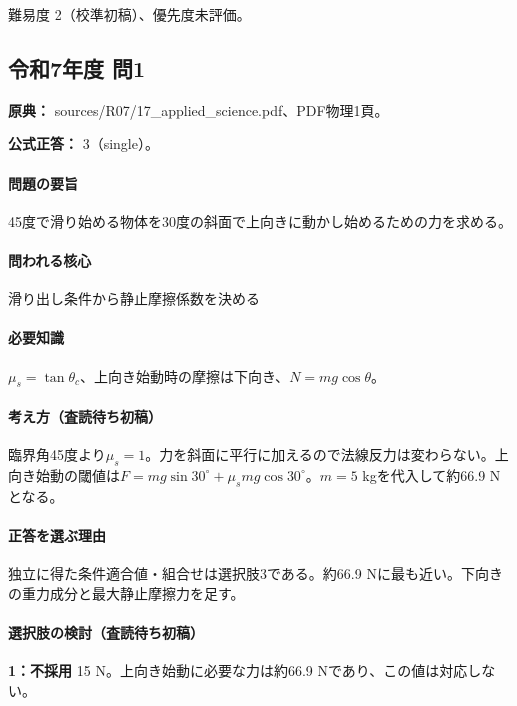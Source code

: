\par 難易度 2（校準初稿）、優先度未評価。

\subsection{令和7年度 問1}
\label{q:r07-reg-applied-01}

\noindent\textbf{原典：} sources/R07/17\_applied\_science.pdf、PDF物理1頁。

\textbf{公式正答：} 3（single）。

\paragraph{問題の要旨} 45度で滑り始める物体を30度の斜面で上向きに動かし始めるための力を求める。

\paragraph{問われる核心} 滑り出し条件から静止摩擦係数を決める

\paragraph{必要知識} \(\mu_s=\tan\theta_c\)、上向き始動時の摩擦は下向き、\(N=mg\cos\theta\)。

\paragraph{考え方（査読待ち初稿）} 臨界角45度より\(\mu_s=1\)。力を斜面に平行に加えるので法線反力は変わらない。上向き始動の閾値は\(F=mg\sin30^\circ+\mu_smg\cos30^\circ\)。\(m=5\) kgを代入して約66.9 Nとなる。

\paragraph{正答を選ぶ理由} 独立に得た条件適合値・組合せは選択肢3である。約66.9 Nに最も近い。下向きの重力成分と最大静止摩擦力を足す。

\paragraph{選択肢の検討（査読待ち初稿）}\mbox{}\par

\noindent\textbf{1：不採用} 15 N。上向き始動に必要な力は約66.9 Nであり、この値は対応しない。\par

